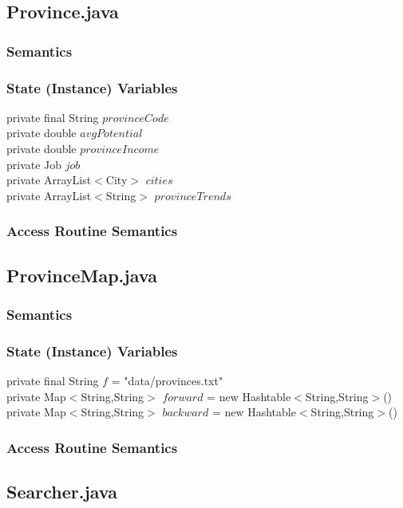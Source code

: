 \documentclass[12pt,fleqn]{article}
\begin{document}
\subsection*{Province.java}\label{pprov}

\subsubsection*{Semantics}
\subsubsection*{State (Instance) Variables}
	private final String $provinceCode$\\
	private double $avgPotential$\\
	private double $provinceIncome$\\
	private Job $job$\\
	private ArrayList$<$City$>$ $cities$\\
	private ArrayList$<$String$>$ $provinceTrends$\\
\subsubsection*{Access Routine Semantics}


\subsection*{ProvinceMap.java}\label{pprovmap}

\subsubsection*{Semantics}
\subsubsection*{State (Instance) Variables}
	private final String $f$ = "data/provinces.txt"\\
	private Map$<$String,String$>$ $forward$ = new Hashtable$<$String,String$>$()\\
	private Map$<$String,String$>$ $backward$ = new Hashtable$<$String,String$>$()
\subsubsection*{Access Routine Semantics}


\subsection*{Searcher.java}\label{psearch}
\end{document}
